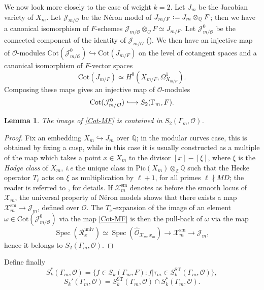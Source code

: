 \documentclass[a4paper,11pt]{amsart}
\numberwithin{equation}{section}
\theoremstyle{plain}
\newtheorem{lemma}[theorem]{Lemma}
\theoremstyle{definition}
\theoremstyle{remark}
\newcommand{\Q}{\mathbb{Q}}
\newcommand{\Z}{\mathbb{Z}}
\newcommand{\defeq}{\vcentcolon=}
\DeclareMathOperator{\Spec}{Spec}
\newcommand{\ST}{\mathrm{ST}}
\newcommand{\Cot}{\mathrm{Cot}}
\newcommand{\longmono}{\mbox{\;$\lhook\joinrel\longrightarrow$\;}}
\begin{document}
We now look more closely to the case of weight $k=2$. Let $J_m$ be the Jacobian variety of $X_m$. Let $\mathcal{J}_{m/\mathcal{O}}$ be the N\'eron model of $J_{m/F}\defeq J_m\otimes_\Q F$; then we have a canonical isomorphism of $F$-schemes $\mathcal{J}_{m/\mathcal{O}}\otimes_{\mathcal{O}}F\simeq J_{m/F}$. Let $\mathcal{J}_{m/\mathcal{O}}^0$ be the connected component of the identity of $\mathcal{J}_{m/\mathcal{O}}$ (\cite[\S1b)]{Mazur-Rational}). 
We then have an injective map of $\mathcal{O}$-modules $\Cot(\mathcal{J}_{m/\mathcal{O}}^0)\hookrightarrow\Cot(J_{m/F})$ on the level of cotangent spaces and a canonical isomorphism of $F$-vector spaces \[\Cot(J_{m/F})\simeq H^0(X_{m/F},\Omega^1_{X_{m/F}}).\] Composing these maps gives an injective map of $\mathcal{O}$-modules 
\begin{equation}\label{Cot-MF}
\Cot(\mathcal{J}_{m/\mathcal{O}}^0)\longmono S_2(\Gamma_m,F).\end{equation}
\begin{lemma}\label{lemma_Cot-MF}
    The image of \eqref{Cot-MF} is contained in $S_2(\Gamma_m,\mathcal{O})$.
\end{lemma}
\begin{proof}
   Fix an embedding 
    $X_m\hookrightarrow J_m$ over $\Q$; in the modular curves case, 
    this is obtained by fixing a cusp, while in this case it
    is usually constructed as a multiple of the map which takes a point
    $x\in X_m$ to the divisor $[x]-[\xi]$, where $\xi$ is the 
    \emph{Hodge class} of $X_m$, \emph{i.e} the unique class in $\mathrm{Pic}(X_m)\otimes_\Z\Q$ such that 
    the Hecke operator $T_\ell$ acts on $\xi$ as multiplication by $\ell+1$, 
    for all primes $\ell\nmid MD$; the reader is referred to \cite[page 30]{Zhang-Annals}, \cite[page 187]{Zhang-AJM} for details. If $\mathcal{X}_m^\mathrm{sm}$ denotes as before the smooth locus of 
    $\mathcal{X}_m$, the universal property of N\'eron models 
    shows that there exists a map $\mathcal{X}_m^\mathrm{sm}\rightarrow\mathcal{J}_m$, 
    defined over $\mathcal{O}$. 
    The $T_x$-expansion of the image of an element $\omega\in \Cot(\mathcal{J}_{m/\mathcal{O}}^0)$ 
    via the map 
    \eqref{Cot-MF} is then the pull-back of $\omega$ via the map 
\[\Spec(\mathcal{R}_x^\mathrm{univ})\simeq\Spec(\widehat{\mathcal{O}}_{\mathcal{X}_{m},x_m})\longrightarrow
\mathcal{X}_m^\mathrm{sm}\longrightarrow\mathcal{J}_m,\] 
hence it belongs to $S_2(\Gamma_m,\mathcal{O})$. 
\end{proof}

Define finally 
\[S_k^*(\Gamma_m,\mathcal{O})=\{f\in S_k(\Gamma_m,F): f|\tau_m\in S_k^\ST(\Gamma_m,\mathcal{O})\},\]
\[S_k'(\Gamma_m,\mathcal{O})= S_k^\ST(\Gamma_m,\mathcal{O})\cap S_k^*(\Gamma_m,\mathcal{O}). \]
\end{document}
